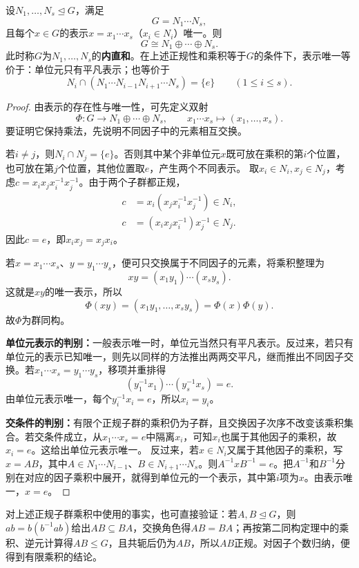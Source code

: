 \begin{theorem}\label{p2:internal-product}\label{p2:concept:c2-l1542}
设$N_1,\ldots,N_s\trianglelefteq G$，满足
\[
G=N_1\cdots N_s,
\]
且每个$x\in G$的表示$x=x_1\cdots x_s$（$x_i\in N_i$）唯一。则
\[
G\cong N_1\oplus\cdots\oplus N_s.
\]
此时称$G$为$N_1,\ldots,N_s$的\textbf{内直和}。在上述正规性和乘积等于$G$的条件下，表示唯一等价于：单位元只有平凡表示；也等价于
\[
N_i\cap(N_1\cdots N_{i-1}N_{i+1}\cdots N_s)=\{e\}
\qquad(1\leq i\leq s).
\]
\end{theorem}
\begin{proof}
由表示的存在性与唯一性，可先定义双射
\[
\Phi:G\longrightarrow N_1\oplus\cdots\oplus N_s,
\qquad x_1\cdots x_s\longmapsto(x_1,\ldots,x_s).
\]
要证明它保持乘法，先说明不同因子中的元素相互交换。

若$i\ne j$，则$N_i\cap N_j=\{e\}$。否则其中某个非单位元$x$既可放在乘积的第$i$个位置，也可放在第$j$个位置，其他位置取$e$，产生两个不同表示。
取$x_i\in N_i,x_j\in N_j$，考虑$c=x_ix_jx_i^{-1}x_j^{-1}$。由于两个子群都正规，
\begin{align*}
c&=x_i(x_jx_i^{-1}x_j^{-1})\in N_i,\\
c&=(x_ix_jx_i^{-1})x_j^{-1}\in N_j.
\end{align*}
因此$c=e$，即$x_ix_j=x_jx_i$。

若$x=x_1\cdots x_s$、$y=y_1\cdots y_s$，便可只交换属于不同因子的元素，将乘积整理为
\[
xy=(x_1y_1)\cdots(x_sy_s).
\]
这就是$xy$的唯一表示，所以
\[
\Phi(xy)=(x_1y_1,\ldots,x_sy_s)=\Phi(x)\Phi(y).
\]
故$\Phi$为群同构。

\textbf{单位元表示的判别：}一般表示唯一时，单位元当然只有平凡表示。反过来，若只有单位元的表示已知唯一，则先以同样的方法推出两两交平凡，继而推出不同因子交换。若$x_1\cdots x_s=y_1\cdots y_s$，移项并重排得
\[
(y_1^{-1}x_1)\cdots(y_s^{-1}x_s)=e.
\]
由单位元表示唯一，每个$y_i^{-1}x_i=e$，所以$x_i=y_i$。

\textbf{交条件的判别：}有限个正规子群的乘积仍为子群，且交换因子次序不改变该乘积集合。若交条件成立，从$x_1\cdots x_s=e$中隔离$x_i$，可知$x_i$也属于其他因子的乘积，故$x_i=e$。这给出单位元表示唯一。
反过来，若$x\in N_i$又属于其他因子的乘积，写$x=AB$，其中$A\in N_1\cdots N_{i-1}$、$B\in N_{i+1}\cdots N_s$。则$A^{-1}xB^{-1}=e$。把$A^{-1}$和$B^{-1}$分别在对应的因子乘积中展开，就得到单位元的一个表示，其中第$i$项为$x$。由表示唯一，$x=e$。
\end{proof}

对上述正规子群乘积中使用的事实，也可直接验证：若$A,B\trianglelefteq G$，则$ab=b(b^{-1}ab)$给出$AB\subseteq BA$，交换角色得$AB=BA$；再按第二同构定理中的乘积、逆元计算得$AB\leq G$，且共轭后仍为$AB$，所以$AB$正规。对因子个数归纳，便得到有限乘积的结论。

